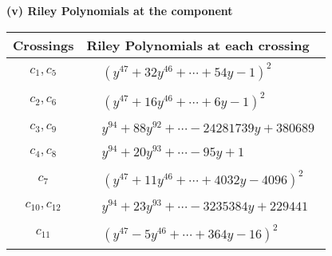 \documentclass[1p]{elsarticle_modified}
\theoremstyle{definition}
\begin{document}
\flushleft \textbf{(v) Riley Polynomials at the component}\newline \\
\begin{tabular}{m{50pt}|m{274pt}}
Crossings & \hspace{64pt}Riley Polynomials at each crossing \\
\hline $$\begin{aligned}c_{1},c_{5}\end{aligned}$$&$\begin{aligned}
&(y^{47}+32 y^{46}+\cdots+54 y-1)^{2}
\end{aligned}$\\
\hline $$\begin{aligned}c_{2},c_{6}\end{aligned}$$&$\begin{aligned}
&(y^{47}+16 y^{46}+\cdots+6 y-1)^{2}
\end{aligned}$\\
\hline $$\begin{aligned}c_{3},c_{9}\end{aligned}$$&$\begin{aligned}
&y^{94}+88 y^{92}+\cdots-24281739 y+380689
\end{aligned}$\\
\hline $$\begin{aligned}c_{4},c_{8}\end{aligned}$$&$\begin{aligned}
&y^{94}+20 y^{93}+\cdots-95 y+1
\end{aligned}$\\
\hline $$\begin{aligned}c_{7}\end{aligned}$$&$\begin{aligned}
&(y^{47}+11 y^{46}+\cdots+4032 y-4096)^{2}
\end{aligned}$\\
\hline $$\begin{aligned}c_{10},c_{12}\end{aligned}$$&$\begin{aligned}
&y^{94}+23 y^{93}+\cdots-3235384 y+229441
\end{aligned}$\\
\hline $$\begin{aligned}c_{11}\end{aligned}$$&$\begin{aligned}
&(y^{47}-5 y^{46}+\cdots+364 y-16)^{2}
\end{aligned}$\\
\hline
\end{tabular}\\~\\
\end{document}
